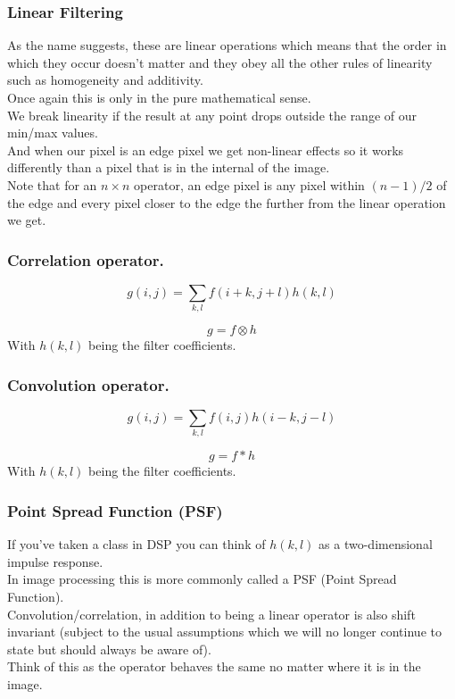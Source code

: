\begin{frame}\frametitle{Linear Filtering}
As the name suggests, these are linear operations which means that the order in which they occur doesn't matter and they obey all the other rules of linearity such as homogeneity and additivity. \\
Once again this is only in the pure mathematical sense. \\
We break linearity if the result at any point drops outside the range of our min/max values.\\ 
And when our pixel is an edge pixel we get non-linear effects so it works differently than a pixel that is in the internal of the image.\\ 
Note that for an $n\times n$ operator, an edge pixel is any pixel within $(n-1)/2$ of the edge and every pixel closer to the edge the further from the linear operation we get.
\end{frame}

\begin{frame}\frametitle{Correlation operator.} 

\begin{equation}
    g(i,j)=\sum_{k,l}f(i+k, j+l)h(k,l)
\end{equation}

\begin{equation}
    g=f \otimes h
\end{equation}
With $h(k,l)$ being the filter coefficients.\\
\end{frame}
\begin{frame}\frametitle{
Convolution operator.}
\begin{equation}
    g(i,j)=\sum_{k,l}f(i, j)h(i-k,j-l)
\end{equation}

\begin{equation}
    g=f \ast h
\end{equation}
With $h(k,l)$ being the filter coefficients.\\
\end{frame}
\begin{frame}\frametitle{Point Spread Function (PSF)}
 If you've taken a class in DSP you can think of $h(k,l)$ as a two-dimensional impulse response. \\In image processing this is more commonly called a PSF (Point Spread Function). \\
Convolution/correlation, in addition to being a linear operator is also shift invariant (subject to the usual assumptions which we will no longer continue to state but should always be aware of).\\
Think of this as the operator behaves the same no matter where it is in the image.
\end{frame}

